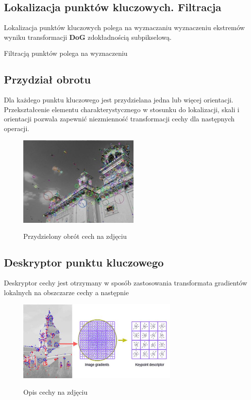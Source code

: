 \iffalse

\subsection{Lokalizacja punktów kluczowych. Filtracja}
   Lokalizacja punktów kluczowych polega na wyznaczaniu wyznaczeniu ekstremów wyniku transformacji \textbf{DoG} zdokładnością subpikselową.

   Filtracją punktów polega na wyznaczeniu

\subsection{Przydział obrotu}
      Dla każdego punktu kluczowego jest przydzielana jedna lub więcej orientacji.
      Przekształcenie elementu charakterystycznego w stosunku do lokalizacji, skali i orientacji pozwala zapewnić niezmienność transformacji cechy dla następnych operacji.
      \begin{figure}[h]
         \centering
         \includegraphics[width=6cm]{SIFT_opencv.jpg}
         \label {fig:SIFT_rot}
         \caption{Przydzielony obrót cech na zdjęciu}
      \end{figure}
\subsection{Deskryptor punktu kluczowego}
      Deskryptor cechy jest otrzymany w sposób zastosowania transformata gradientów lokalnych na obszczarze cechy a następnie
      \begin{figure}[h]
         \centering
         \includegraphics[width=8cm]{SIFT_vectors.jpg}
         \label {fig:SIFT_desc}
         \caption{Opis cechy na zdjęciu}
      \end{figure}

